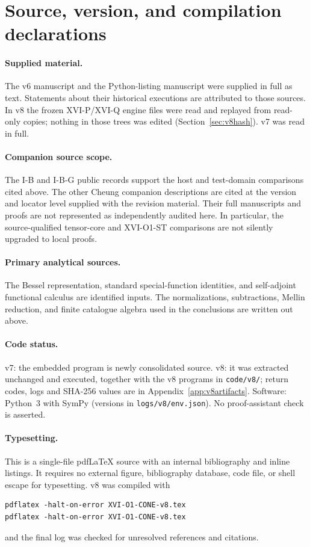 \documentclass[11pt,a4paper]{article}
\newcommand{\loc}[1]{\nolinkurl{#1}}
\theoremstyle{plain}
\theoremstyle{definition}
\theoremstyle{remark}
\numberwithin{equation}{section}
\begin{document}
\section{Source, version, and compilation declarations}
\label{app:declarations}

\paragraph{Supplied material.}
The v6 manuscript and the Python-listing manuscript were supplied
in full as text. Statements about their historical executions
are attributed to those sources.
In v8 the frozen XVI-P/XVI-Q engine files were read and replayed
from read-only copies; nothing in those trees was edited
(Section~\ref{sec:v8hash}). v7 was read in full.

\paragraph{Companion source scope.}
The I-B and I-B-G public records support the host and test-domain
comparisons cited above. The other Cheung companion descriptions
are cited at the version and locator level supplied with the
revision material. Their full manuscripts and proofs are not
represented as independently audited here.
In particular, the source-qualified tensor-core and
XVI-O1-ST comparisons are not silently upgraded to local proofs.

\paragraph{Primary analytical sources.}
The Bessel representation, standard special-function identities,
and self-adjoint functional calculus are identified inputs.
The normalizations, subtractions, Mellin reduction, and finite
catalogue algebra used in the conclusions are written out above.

\paragraph{Code status.}
v7: the embedded program is newly consolidated source.
v8: it was extracted unchanged and executed, together with the
v8 programs in \loc{code/v8/}; return codes, logs and SHA-256 values
are in Appendix~\ref{app:v8artifacts}. Software: Python~3 with SymPy
(versions in \loc{logs/v8/env.json}). No proof-assistant check is
asserted.

\paragraph{Typesetting.}
This is a single-file pdfLaTeX source with an internal
bibliography and inline listings. It requires no external figure,
bibliography database, code file, or shell escape for typesetting.
v8 was compiled with
\begin{verbatim}
pdflatex -halt-on-error XVI-O1-CONE-v8.tex
pdflatex -halt-on-error XVI-O1-CONE-v8.tex
\end{verbatim}
and the final log was checked for unresolved references and
citations.
\end{document}
